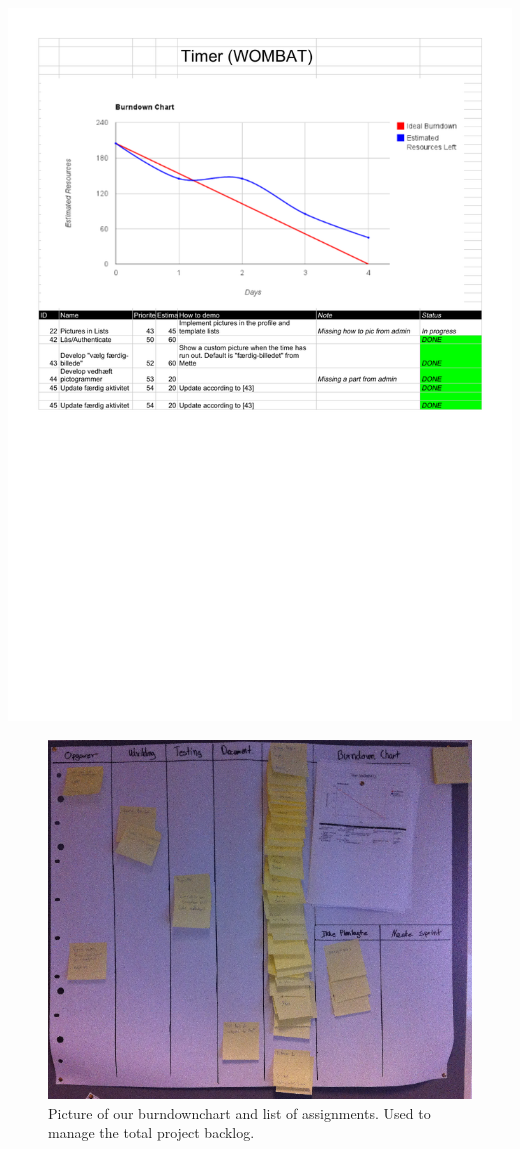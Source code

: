 \begin{center}
		\includegraphics[width=\textwidth]{Development/burndown_charts/Sprint_6.pdf}
	\end{center}
	
	\begin{figure}[H]
		\centering
			\includegraphics[width=\textwidth]{Images/burndown.png}
				\caption{Picture of our burndownchart and list of assignments. Used to manage the total project backlog.}
		\label{fig:burn}
	\end{figure}
	
